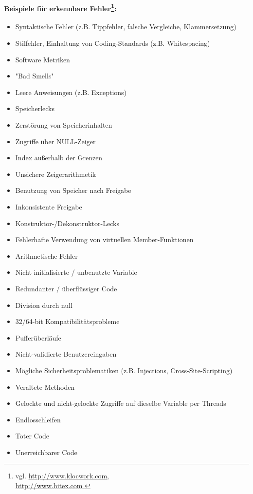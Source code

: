 \paragraph{Beispiele für erkennbare Fehler\footnote{vgl. \url{http://www.klocwork.com}, \\\url{http://www.hitex.com }}:}
\begin{itemize}
\item Syntaktische Fehler (z.B. Tippfehler, falsche Vergleiche, Klammersetzung)
\item Stilfehler, Einhaltung von Coding-Standards (z.B. Whitespacing)
\item Software Metriken 
\item "Bad Smells"
\item Leere Anweisungen (z.B. Exceptions)
\item Speicherlecks
\item Zerstörung von Speicherinhalten
\item Zugriffe über NULL-Zeiger
\item Index außerhalb der Grenzen
\item Unsichere Zeigerarithmetik
\item Benutzung von Speicher nach Freigabe
\item Inkonsistente Freigabe
\item Konstruktor-/Dekonstruktor-Lecks
\item Fehlerhafte Verwendung von virtuellen Member-Funktionen
\item Arithmetische Fehler
\item Nicht initialisierte / unbenutzte Variable
\item Redundanter / überflüssiger Code
\item Division durch null
\item 32/64-bit Kompatibilitätsprobleme
\item Pufferüberläufe
\item Nicht-validierte Benutzereingaben
\item Mögliche Sicherheitsproblematiken (z.B. Injections, Cross-Site-Scripting)
\item Veraltete Methoden
\item Gelockte und nicht-gelockte Zugriffe auf dieselbe Variable per Threads
\item Endlosschleifen
\item Toter Code
\item Unerreichbarer Code
\end{itemize}
